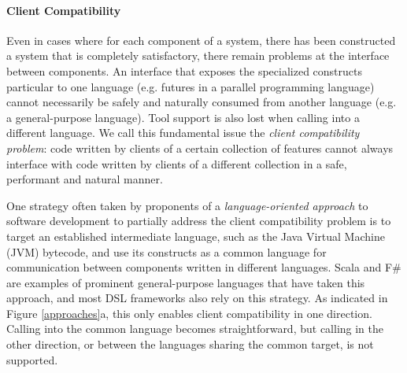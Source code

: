 
\paragraph{Client Compatibility} Even in cases where for each component of a system, there has been constructed a  system that is completely satisfactory, there remain problems at the interface between components. An interface that exposes the specialized constructs particular to one language (e.g. futures in a parallel programming language) cannot necessarily be safely and naturally consumed from another language (e.g. a general-purpose language). Tool support is also lost when calling into a different language. We call this fundamental issue the \emph{client compatibility problem}: code written by clients of a certain collection of features cannot always interface with code written by clients of a different collection  in a safe, performant and natural manner.

One strategy often taken by proponents of a \emph{language-oriented approach} to software development \cite{journals/stp/Ward94} to partially address the client compatibility problem is to  target an established intermediate language, such as the Java Virtual Machine (JVM) bytecode, and use its constructs as a common language for communication between components written in different languages. Scala \cite{200464/IC} and F\# \cite{pickering2007foundations} are examples of prominent general-purpose languages that have taken this approach, and most DSL frameworks also rely on this strategy. As indicated in Figure \ref{approaches}a, this only enables client compatibility in one direction. Calling into the common language becomes straightforward, but calling in the other direction, or between the languages sharing the common target, is not supported. 

